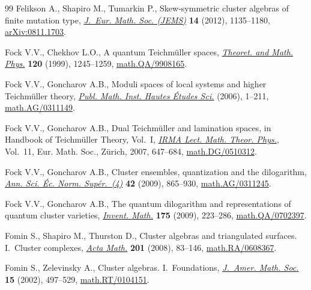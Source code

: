 \begin{thebibliography}{99}
Felikson A., Shapiro M., Tumarkin P., Skew-symmetric cluster algebras of finite
 mutation type, \href{https://doi.org/10.4171/JEMS/329}{\textit{J.~Eur. Math. Soc. (JEMS)}} \textbf{14} (2012),
 1135--1180, \href{https://arxiv.org/abs/0811.1703}{arXiv:0811.1703}.

Fock V.V., Chekhov L.O., A quantum {T}eichm\"{u}ller spaces, \href{https://doi.org/10.1007/BF02557246}{\textit{Theoret.
 and Math. Phys.}} \textbf{120} (1999), 1245--1259, \href{https://arxiv.org/abs/math.QA/9908165}{math.QA/9908165}.

Fock V.V., Goncharov A.B., Moduli spaces of local systems and higher
 {T}eichm\"{u}ller theory, \href{https://doi.org/10.1007/s10240-006-0039-4}{\textit{Publ. Math. Inst. Hautes \'{E}tudes Sci.}}
 (2006), 1--211, \href{https://arxiv.org/abs/math.AG/0311149}{math.AG/0311149}.

Fock V.V., Goncharov A.B., Dual {T}eichm\"{u}ller and lamination spaces, in
 Handbook of {T}eichm\"{u}ller Theory, {V}ol.~{I}, \href{https://doi.org/10.4171/029-1/16}{\textit{IRMA Lect. Math.
 Theor. Phys.}}, Vol.~11, Eur. Math. Soc., Z\"{u}rich, 2007, 647--684,
 \href{https://arxiv.org/abs/math.DG/0510312}{math.DG/0510312}.

Fock V.V., Goncharov A.B., Cluster ensembles, quantization and the dilogarithm,
 \href{https://doi.org/10.1007/978-0-8176-4745-2_15}{\textit{Ann. Sci. \'{E}c. Norm. Sup\'{e}r.~(4)}} \textbf{42} (2009), 865--930,
 \href{https://arxiv.org/abs/math.AG/0311245}{math.AG/0311245}.

Fock V.V., Goncharov A.B., The quantum dilogarithm and representations of
 quantum cluster varieties, \href{https://doi.org/10.1007/s00222-008-0149-3}{\textit{Invent. Math.}} \textbf{175} (2009),
 223--286, \href{https://arxiv.org/abs/math.QA/0702397}{math.QA/0702397}.

Fomin S., Shapiro M., Thurston D., Cluster algebras and triangulated surfaces.
 {I}.~{C}luster complexes, \href{https://doi.org/10.1007/s11511-008-0030-7}{\textit{Acta Math.}} \textbf{201} (2008), 83--146,
 \href{https://arxiv.org/abs/math.RA/0608367}{math.RA/0608367}.

Fomin S., Zelevinsky A., Cluster algebras. {I}.~{F}oundations, \href{https://doi.org/10.1090/S0894-0347-01-00385-X}{\textit{J.~Amer.
 Math. Soc.}} \textbf{15} (2002), 497--529, \href{https://arxiv.org/abs/math.RT/0104151}{math.RT/0104151}.


\end{thebibliography}
